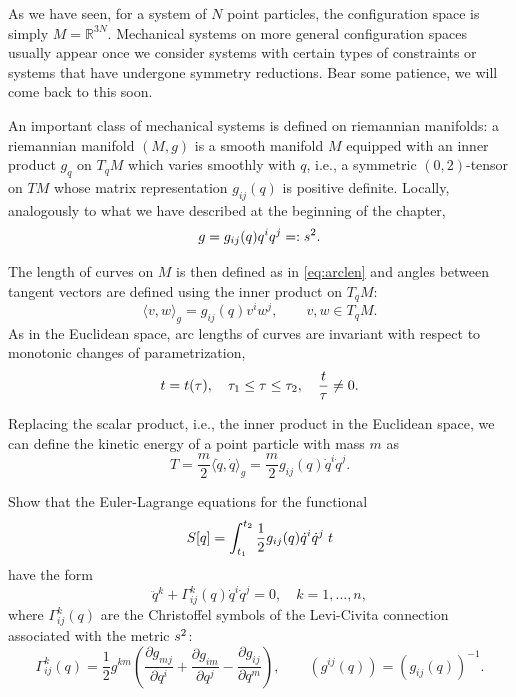 \documentclass[english,fontsize=11pt,paper=a5,oneside]{scrbook}
\newcommand{\R}{\mathbb{R}}
\newcommand{\lag}{\langle}
\newcommand{\rag}{\rangle}
\let\d\relax
\newcommand{\d}{\mathrm{d}}
\theoremstyle{definition}
\newenvironment{exercise}
  {\pushQED{\qed}\renewcommand{\qedsymbol}{$\maltese$}\exercisex}
  {\popQED\endexercisex}
\begin{document}
As we have seen, for a system of $N$ point particles, the configuration space is simply $M=\R^{3N}$. Mechanical systems on more general configuration spaces usually appear once we consider systems with certain types of constraints or systems that have undergone symmetry reductions.
Bear some patience, we will come back to this soon.
\medskip

An important class of mechanical systems is defined on riemannian manifolds: a riemannian manifold $(M, g)$ is a smooth manifold $M$ equipped with an inner product $g_q$ on $T_q M$ which varies smoothly with $q$, i.e., a symmetric $(0,2)$-tensor on $TM$ whose matrix representation $g_{ij}(q)$ is positive definite.
Locally, analogously to what we have described at the beginning of the chapter,
\begin{equation}
  g = g_{ij}(q) \d q^i \d q^j =: \d s^2.
\end{equation}

The length of curves on $M$ is then defined as in \eqref{eq:arclen} and angles between tangent vectors are defined using the inner product on $T_qM$:
\begin{equation}
  \lag v, w\rag_g = g_{ij}(q) v^i w^j, \qquad v,w\in T_q M.
\end{equation}
As in the Euclidean space, arc lengths of curves are invariant with respect to monotonic changes of parametrization,
\begin{equation}
  t = t(\tau),\quad \tau_1\leq \tau\leq \tau_2, \quad \frac{\d t}{\d \tau}\neq 0.
\end{equation}

Replacing the scalar product, i.e., the inner product in the Euclidean space, we can define the kinetic energy of a point particle with mass $m$ as
\begin{equation}
  T = \frac m2 \lag\dot q, \dot q\rag_g = \frac{m}2 g_{ij}(q)\dot q^i\dot q^j.
\end{equation}

\begin{exercise}\label{exe:geodesic1}
  Show that the Euler-Lagrange equations for the functional
  \begin{equation}
    S[q] = \int_{t_1}^{t_2} \frac 12 g_{ij}(q) \dot q^i \dot q^j\; \d t
  \end{equation}
  have the form
  \begin{equation}\label{eq:geodesic}
    \ddot q^k + \Gamma_{ij}^k(q) \dot q^i \dot q^j = 0, \quad k=1,\ldots, n,
  \end{equation}
  where $\Gamma_{ij}^k(q)$ are the Christoffel symbols of the Levi-Civita connection associated with the metric $\d s^2$:
  \begin{equation}
    \Gamma_{ij}^k(q) = \frac12 g^{km}\left(
    \frac{\partial g_{mj}}{\partial q^i} + \frac{\partial g_{im}}{\partial q^j}-\frac{\partial g_{ij}}{\partial q^m}
    \right),
    \qquad (g^{ij}(q)) = (g_{ij}(q))^{-1}.
  \end{equation}
\end{exercise}
\end{document}
